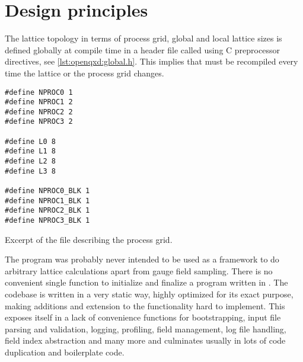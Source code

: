 
\section{Design principles}
\label{sec:openqxd:design}

The lattice topology in terms of process grid, global and local lattice sizes is defined globally at compile time in a header file called  using C preprocessor directives, see \cref{lst:openqxd:global.h}. This implies that \openqxd must be recompiled every time the lattice or the process grid changes.
\begin{codelisting}
\begin{verbatim}
#define NPROC0 1
#define NPROC1 2
#define NPROC2 2
#define NPROC3 2

#define L0 8
#define L1 8
#define L2 8
#define L3 8

#define NPROC0_BLK 1
#define NPROC1_BLK 1
#define NPROC2_BLK 1
#define NPROC3_BLK 1
\end{verbatim}
\caption{Excerpt of the file  describing the \openqxd process grid.}
\label{lst:openqxd:global.h}
\end{codelisting}

The program was probably never intended to be used as a framework to do arbitrary lattice calculations apart from gauge field sampling. There is no convenient single function to initialize and finalize a program written in \openqxd. The codebase is written in a very static way, highly optimized for its exact purpose, making additions and extension to the functionality hard to implement. This exposes itself in a lack of convenience functions for bootstrapping, input file parsing and validation, logging, profiling, field management, log file handling, field index abstraction and many more and culminates usually in lots of code duplication and boilerplate code.

